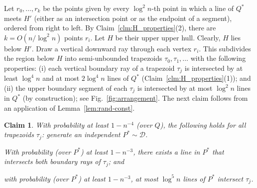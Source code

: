 \documentclass[letterpaper,11pt]{article}
\newtheorem{claim}[theorem]{Claim}
\newcommand{\cD}{\mathcal{D}}
\begin{document}
Let $r_0, \dots, r_k$ be the 
points given by every $\log^2 n$-th 
point in which a line of $Q^*$ meets 
$H'$ (either as an intersection point 
or as the endpoint of a segment), 
ordered from right to left.
By Claim~\ref{clm:H_properties}(2), there 
are $k = O(n/\log^2 n)$ points $r_i$. 
Let $H$ be their upper upper hull.
Clearly, $H$ lies below $H'$.
Draw a vertical downward ray through each vertex
$r_i$. This subdivides the region below 
$H$ into semi-unbounded trapezoids
$\tau_0, \tau_1, \dots$ with
the following properties:
(i) each vertical boundary ray 
  of a trapezoid $\tau_j$ is intersected
  by at least $\log^4 n$ and at most
  $2\log^4 n$ lines of $Q^*$ 
  (Claim~\ref{clm:H_properties}(1)); and 
(ii) the upper boundary
  segment of each $\tau_j$ is intersected 
  by at most $\log^2 n$ lines in 
  $Q^*$ (by construction); see 
  Fig.~\ref{fig:arrangement}.
The next claim follows from an 
application of Lemma~\ref{lem:rand-const}.

\begin{claim}\label{clm:taui}
  With probability at least 
  $1-n^{-4}$ \textup(over 
  $Q$\textup), the 
  following holds for all 
  trapezoids $\tau_j$: 
  generate an
  independent $P^* \sim \cD$.
  \begin{asparaenum}
    \item With probability 
    \textup(over $P^*$\textup) 
    at least $1 - n^{-3}$, 
    there exists a line in $P^*$ 
    that intersects both 
    boundary rays of $\tau_j$; and
    \item with probability 
    \textup(over $P^*$\textup) at 
    least $1 - n^{-3}$, at 
    most $\log^5 n$ lines 
    of $P^*$ intersect $\tau_j$.
\end{asparaenum}
\end{claim}
\end{document}
